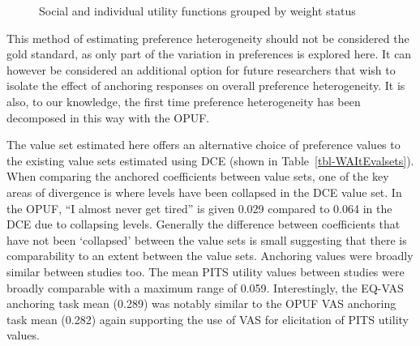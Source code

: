 \documentclass[
  number,
  preprint]{elsarticle}
\begin{document}
\begin{figure}


\caption{\label{fig-weight}Social and individual utility functions
grouped by weight status}

\end{figure}%

This method of estimating preference heterogeneity should not be
considered the gold standard, as only part of the variation in
preferences is explored here. It can however be considered an additional
option for future researchers that wish to isolate the effect of
anchoring responses on overall preference heterogeneity. It is also, to
our knowledge, the first time preference heterogeneity has been
decomposed in this way with the OPUF.

The value set estimated here offers an alternative choice of preference
values to the existing value sets estimated using DCE (shown in
Table~\ref{tbl-WAItEvalsets}). When comparing the anchored coefficients
between value sets, one of the key areas of divergence is where levels
have been collapsed in the DCE value set. In the OPUF, ``I almost never
get tired'' is given 0.029 compared to 0.064 in the DCE due to
collapsing levels. Generally the difference between coefficients that
have not been `collapsed' between the value sets is small suggesting
that there is comparability to an extent between the value sets.
Anchoring values were broadly similar between studies too. The mean PITS
utility values between studies were broadly comparable with a maximum
range of 0.059. Interestingly, the EQ-VAS \citep{webb2020transforming}
anchoring task mean (0.289) was notably similar to the OPUF VAS
anchoring task mean (0.282) again supporting the use of VAS for
elicitation of PITS utility values.
\end{document}
